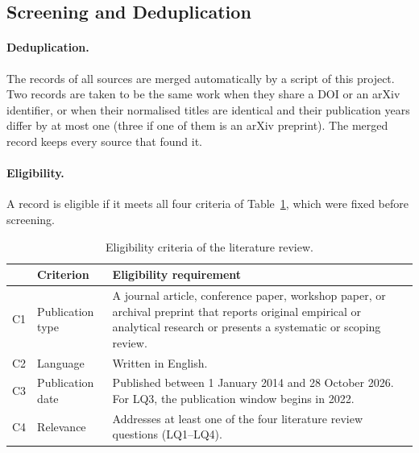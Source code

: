 \subsection{Screening and Deduplication}
\label{sec:lit-screening}
\paragraph{Deduplication.} The records of all sources are merged automatically
by a script of this project. Two records are taken to be the same work when
they share a DOI or an arXiv identifier, or when their normalised titles are identical and
their publication years differ by at most one (three if one of them is an arXiv preprint).
The merged record keeps every source that found it.

\paragraph{Eligibility.} A record is eligible if it meets all four criteria of
Table~\ref{tab:lit-eligibility}, which were fixed before screening.

\begin{table}[H]
\centering
\begin{singlespace}
\caption[Eligibility criteria of the literature review]{Eligibility criteria of
the literature review.}
\label{tab:lit-eligibility}
\small
\begin{tabularx}{\textwidth}{@{}l>{\raggedright\arraybackslash}p{2.6cm}>{\raggedright\arraybackslash}X@{}}
\toprule
 & \textbf{Criterion} & \textbf{Eligibility requirement} \\
\midrule
C1 & Publication type & A journal article, conference paper, workshop paper, or archival preprint that reports original empirical or analytical research or presents a systematic or scoping review. \\
C2 & Language & Written in English. \\
C3 & Publication date & Published between 1 January 2014 and 28 October 2026. For LQ3, the publication window begins in 2022. \\
C4 & Relevance & Addresses at least one of the four literature review questions (LQ1--LQ4). \\
\bottomrule
\end{tabularx}
\end{singlespace}
\end{table}

